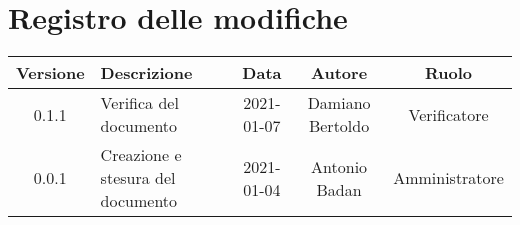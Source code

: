 \section*{Registro delle modifiche}

\begin{center}
	\begin{longtable}{|c|p{5cm}|c|c|c|}
	\hline
	\rowcolor{lighter-grayer}
	\textbf{Versione} & \textbf{Descrizione} & \textbf{Data} & \textbf{Autore} & \textbf{Ruolo} \\
	\hline
	\endfirsthead


	\hline
	0.1.1 & Verifica del documento & 2021-01-07 & Damiano Bertoldo & Verificatore \\
	\hline
	0.0.1 & Creazione e stesura del documento & 2021-01-04 & Antonio Badan & Amministratore \\
	\hline
	\end{longtable}
\end{center}